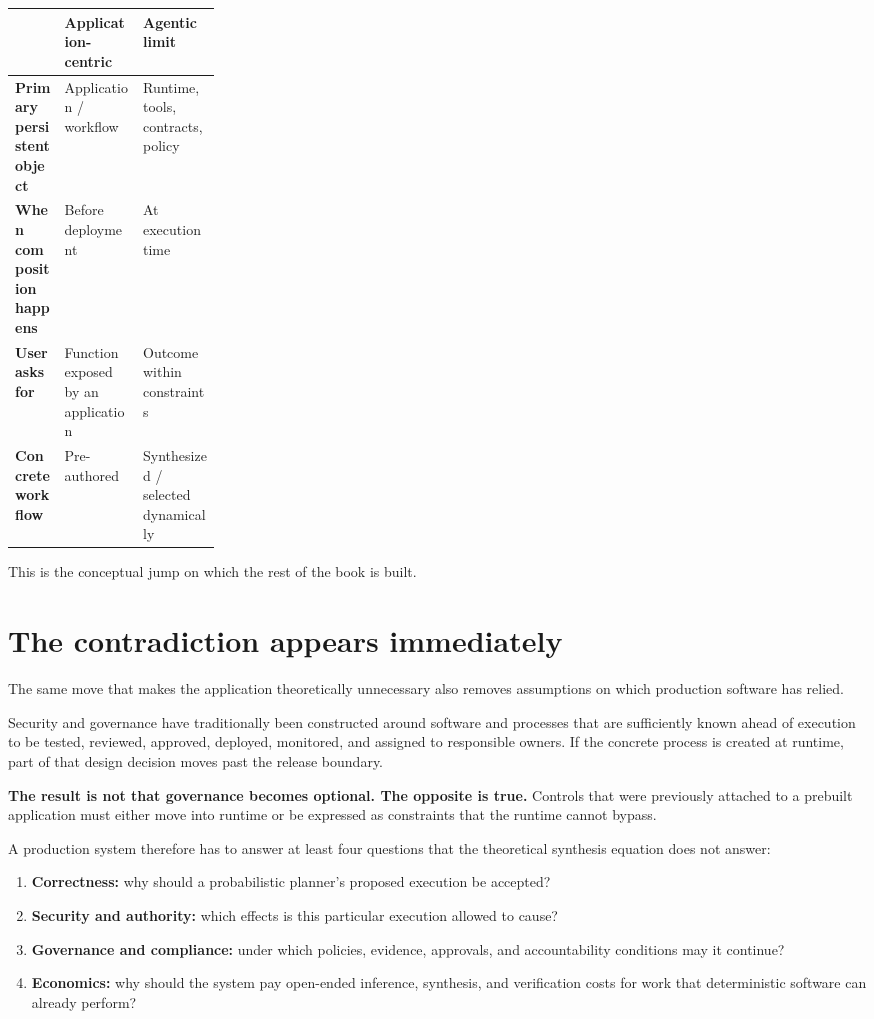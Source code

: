 \documentclass[10pt,oneside,openany]{book}
\begin{document}
\begin{center}
\begin{tabularx}{0.94\linewidth}{>{\raggedright\arraybackslash\bfseries}p{0.24\linewidth} Y Y}
\toprule
 & Application-centric & Agentic limit \\
\midrule
Primary persistent object & Application / workflow & Runtime, tools, contracts, policy \\
When composition happens & Before deployment & At execution time \\
User asks for & Function exposed by an application & Outcome within constraints \\
Concrete workflow & Pre-authored & Synthesized / selected dynamically \\
\bottomrule
\end{tabularx}
\end{center}

This is the conceptual jump on which the rest of the book is built.

\section{The contradiction appears immediately}

The same move that makes the application theoretically unnecessary also removes assumptions on which production software has relied.

Security and governance have traditionally been constructed around software and processes that are sufficiently known ahead of execution to be tested, reviewed, approved, deployed, monitored, and assigned to responsible owners. If the concrete process is created at runtime, part of that design decision moves past the release boundary.

\textbf{The result is not that governance becomes optional. The opposite is true.} Controls that were previously attached to a prebuilt application must either move into runtime or be expressed as constraints that the runtime cannot bypass.

A production system therefore has to answer at least four questions that the theoretical synthesis equation does not answer:

\begin{enumerate}
\item \textbf{Correctness:} why should a probabilistic planner's proposed execution be accepted?
\item \textbf{Security and authority:} which effects is this particular execution allowed to cause?
\item \textbf{Governance and compliance:} under which policies, evidence, approvals, and accountability conditions may it continue?
\item \textbf{Economics:} why should the system pay open-ended inference, synthesis, and verification costs for work that deterministic software can already perform?
\end{enumerate}
\end{document}
